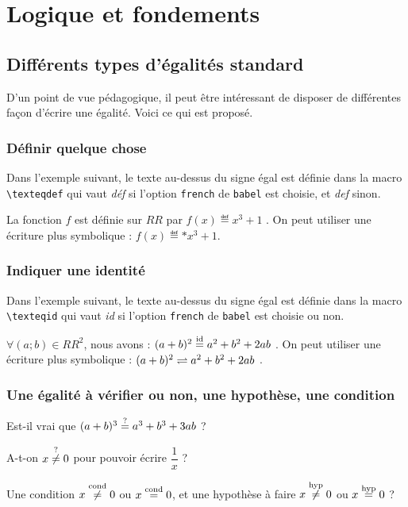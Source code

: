 \documentclass[12pt,a4paper]{article}
\newcommand\RR{RR}
\begin{document}
\section{Logique et fondements}

    \subsection{Différents types d'égalités \og standard \fg}
    
D'un point de vue pédagogique, il peut être intéressant de disposer de différentes façon d'écrire une égalité. Voici ce qui est proposé.

        \subsubsection{Définir quelque chose}

Dans l'exemple suivant, le texte au-dessus du signe égal est définie dans la macro \verb+\texteqdef+ qui vaut \emph{\og déf \fg} si l'option \verb+french+ de \verb+babel+ est choisie, et \emph{\og def \fg} sinon.

\begin{tcblisting}{}
La fonction $f$ est définie sur $\RR$ par $f(x) \eqdef x^3 + 1$ .
On peut utiliser une écriture plus symbolique : $f(x) \eqdef* x^3 + 1$.
\end{tcblisting}


        \subsubsection{Indiquer une identité}

Dans l'exemple suivant, le texte au-dessus du signe égal est définie dans la macro \verb+\texteqid+ qui vaut \emph{\og id \fg} si l'option \verb+french+ de \verb+babel+ est choisie ou non.

\begin{tcblisting}{}
$\forall (a ; b) \in \RR^2$, nous avons : $(a + b)^2 \eqid a^2 + b^2 + 2 a b$ .
On peut utiliser une écriture plus symbolique : $(a + b)^2 \eqid* a^2 + b^2 + 2 a b$ .
\end{tcblisting}


        \subsubsection{Une égalité à vérifier ou non, une hypothèse, une condition}

\begin{tcblisting}{}
Est-il vrai que $(a + b)^3 \eqtest a^3 + b^3 + 3 a b$ ?

A-t-on $x \neqtest 0$ pour pouvoir écrire $\dfrac{1}{x}$ ?

Une condition $x \neqcond 0$ ou $x \eqcond 0$, et une hypothèse à faire $x \neqhyp 0$
ou $x \eqhyp 0$ ?
\end{tcblisting}
\end{document}
